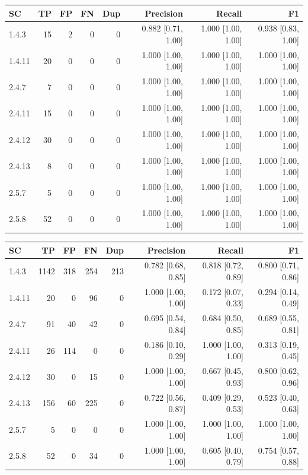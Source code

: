 \begin{tabular}{lrrrrrrr}
\hline
SC & TP & FP & FN & Dup & Precision & Recall & F1 \\
\hline
1.4.3 & 15 & 2 & 0 & 0 & 0.882 [0.71, 1.00] & 1.000 [1.00, 1.00] & 0.938 [0.83, 1.00] \\
1.4.11 & 20 & 0 & 0 & 0 & 1.000 [1.00, 1.00] & 1.000 [1.00, 1.00] & 1.000 [1.00, 1.00] \\
2.4.7 & 7 & 0 & 0 & 0 & 1.000 [1.00, 1.00] & 1.000 [1.00, 1.00] & 1.000 [1.00, 1.00] \\
2.4.11 & 15 & 0 & 0 & 0 & 1.000 [1.00, 1.00] & 1.000 [1.00, 1.00] & 1.000 [1.00, 1.00] \\
2.4.12 & 30 & 0 & 0 & 0 & 1.000 [1.00, 1.00] & 1.000 [1.00, 1.00] & 1.000 [1.00, 1.00] \\
2.4.13 & 8 & 0 & 0 & 0 & 1.000 [1.00, 1.00] & 1.000 [1.00, 1.00] & 1.000 [1.00, 1.00] \\
2.5.7 & 5 & 0 & 0 & 0 & 1.000 [1.00, 1.00] & 1.000 [1.00, 1.00] & 1.000 [1.00, 1.00] \\
2.5.8 & 52 & 0 & 0 & 0 & 1.000 [1.00, 1.00] & 1.000 [1.00, 1.00] & 1.000 [1.00, 1.00] \\
\hline
\end{tabular}

\begin{tabular}{lrrrrrrr}
\hline
SC & TP & FP & FN & Dup & Precision & Recall & F1 \\
\hline
1.4.3 & 1142 & 318 & 254 & 213 & 0.782 [0.68, 0.85] & 0.818 [0.72, 0.89] & 0.800 [0.71, 0.86] \\
1.4.11 & 20 & 0 & 96 & 0 & 1.000 [1.00, 1.00] & 0.172 [0.07, 0.33] & 0.294 [0.14, 0.49] \\
2.4.7 & 91 & 40 & 42 & 0 & 0.695 [0.54, 0.84] & 0.684 [0.50, 0.85] & 0.689 [0.55, 0.81] \\
2.4.11 & 26 & 114 & 0 & 0 & 0.186 [0.10, 0.29] & 1.000 [1.00, 1.00] & 0.313 [0.19, 0.45] \\
2.4.12 & 30 & 0 & 15 & 0 & 1.000 [1.00, 1.00] & 0.667 [0.45, 0.93] & 0.800 [0.62, 0.96] \\
2.4.13 & 156 & 60 & 225 & 0 & 0.722 [0.56, 0.87] & 0.409 [0.29, 0.53] & 0.523 [0.40, 0.63] \\
2.5.7 & 5 & 0 & 0 & 0 & 1.000 [1.00, 1.00] & 1.000 [1.00, 1.00] & 1.000 [1.00, 1.00] \\
2.5.8 & 52 & 0 & 34 & 0 & 1.000 [1.00, 1.00] & 0.605 [0.40, 0.79] & 0.754 [0.57, 0.88] \\
\hline
\end{tabular}

